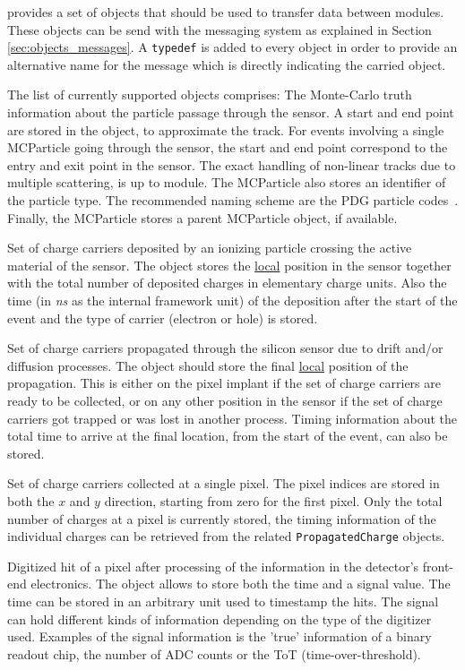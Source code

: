 \apsq provides a set of objects that should be used to transfer data between modules.
These objects can be send with the messaging system as explained in Section \ref{sec:objects_messages}.
A \texttt{typedef} is added to every object in order to provide an alternative name for the message which is directly indicating the carried object.

The list of currently supported objects comprises:
The Monte-Carlo truth information about the particle passage through the sensor.
A start and end point are stored in the object, to approximate the track.
For events involving a single MCParticle going through the sensor, the start and end point correspond to the entry and exit point in the sensor.
The exact handling of non-linear tracks due to multiple scattering, is up to module.
The MCParticle also stores an identifier of the particle type.
The recommended naming scheme are the PDG particle codes~\cite{pdg}.
Finally, the MCParticle stores a parent MCParticle object, if available.

Set of charge carriers deposited by an ionizing particle crossing the active material of the sensor.
The object stores the \underline{local} position in the sensor together with the total number of deposited charges in elementary charge units.
Also the time (in \textit{ns} as the internal framework unit) of the deposition after the start of the event and the type of carrier (electron or hole) is stored.

Set of charge carriers propagated through the silicon sensor due to drift and/or diffusion processes.
The object should store the final \underline{local} position of the propagation.
This is either on the pixel implant if the set of charge carriers are ready to be collected, or on any other position in the sensor if the set of charge carriers got trapped or was lost in another process.
Timing information about the total time to arrive at the final location, from the start of the event, can also be stored.

Set of charge carriers collected at a single pixel.
The pixel indices are stored in both the $x$ and $y$ direction, starting from zero for the first pixel.
Only the total number of charges at a pixel is currently stored, the timing information of the individual charges can be retrieved from the related \texttt{PropagatedCharge} objects.

Digitized hit of a pixel after processing of the information in the detector's front-end electronics.
The object allows to store both the time and a signal value.
The time can be stored in an arbitrary unit used to timestamp the hits.
The signal can hold different kinds of information depending on the type of the digitizer used.
Examples of the signal information is the 'true' information of a binary readout chip, the number of ADC counts or the ToT (time-over-threshold).

